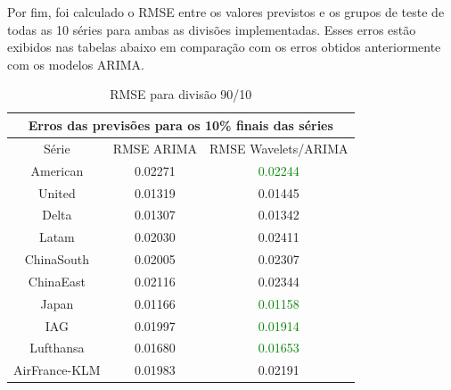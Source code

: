 \documentclass[12pt]{article}
\begin{document}
	Por fim, foi calculado o RMSE entre os valores previstos e os grupos de teste de todas as 10 séries para ambas as divisões implementadas. Esses erros estão exibidos nas tabelas abaixo em comparação com os erros obtidos anteriormente com os modelos ARIMA.
	
	\begin{table}[H]\label{tab:RMSE_Wave_all}
		\centering
		
		\begin{tabular}{|c|c|c|}
			\hline
			\multicolumn{3}{|c|}{Erros das previsões para os 10\% finais das séries} \\ \hline
			Série                 & RMSE ARIMA         & RMSE Wavelets/ARIMA         \\ \hline
			American              & 0.02271            & \textcolor{green}{0.02244}                     \\
			United                & 0.01319            & 0.01445                     \\
			Delta                 & 0.01307            & 0.01342                     \\
			Latam                 & 0.02030            & 0.02411                     \\
			ChinaSouth            & 0.02005            & 0.02307                     \\
			ChinaEast             & 0.02116            & 0.02344                     \\
			Japan                 & 0.01166            & \textcolor{green}{0.01158}                     \\
			IAG                   & 0.01997            & \textcolor{green}{0.01914}                     \\
			Lufthansa             & 0.01680            & \textcolor{green}{0.01653}                     \\
			AirFrance-KLM         & 0.01983            & 0.02191                     \\ \hline
		\end{tabular}
		\caption{RMSE para divisão 90/10}
	\end{table}
	
\end{document}

